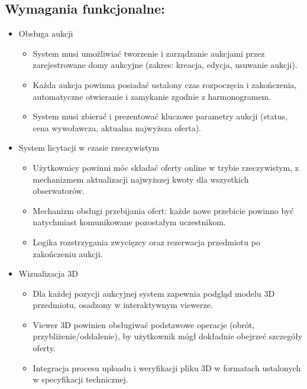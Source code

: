 
\subsection{Wymagania funkcjonalne:}
\begin{itemize}
    \item Obsługa aukcji
          \begin{itemize}
              \item System musi umożliwiać tworzenie i zarządzanie aukcjami przez zarejestrowane domy aukcyjne (zakres: kreacja, edycja, usuwanie aukcji).
              \item Każda aukcja powinna posiadać ustalony czas rozpoczęcia i zakończenia, automatyczne otwieranie i zamykanie zgodnie z harmonogramem.
              \item System musi zbierać i prezentować kluczowe parametry aukcji (status, cena wywoławcza, aktualna najwyższa oferta).
          \end{itemize}
    \item System licytacji w czasie rzeczywistym
          \begin{itemize}
              \item Użytkownicy powinni móc składać oferty online w trybie rzeczywistym, z mechanizmem aktualizacji najwyższej kwoty dla wszystkich obserwatorów.
              \item Mechanizm obsługi przebijania ofert: każde nowe przebicie powinno być natychmiast komunikowane pozostałym uczestnikom.
              \item Logika rozstrzygania zwycięzcy oraz rezerwacja przedmiotu po zakończeniu aukcji.
          \end{itemize}
    \item Wizualizacja 3D
          \begin{itemize}
              \item Dla każdej pozycji aukcyjnej system zapewnia podgląd modelu 3D przedmiotu, osadzony w interaktywnym viewerze.
              \item Viewer 3D powinien obsługiwać podstawowe operacje (obrót, przybliżenie/oddalenie), by użytkownik mógł dokładnie obejrzeć szczegóły oferty.
              \item Integracja procesu uploadu i weryfikacji pliku 3D w formatach ustalonych w specyfikacji technicznej.
          \end{itemize}

\end{itemize}
